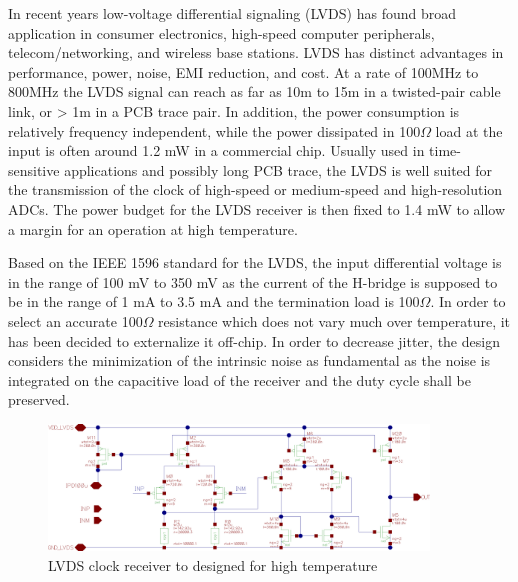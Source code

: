 In recent years low-voltage differential signaling (LVDS) has found broad application in consumer electronics, high-speed computer peripherals, telecom/networking, and wireless base stations. LVDS has distinct advantages in performance, power, noise, EMI reduction, and cost. At a rate of 100MHz to 800MHz the LVDS signal can reach as far as 10m to 15m in a twisted-pair cable link, or > 1m in a PCB trace pair. In addition, the power consumption is relatively frequency independent, while the power dissipated in 100$\Omega$ load at the input is often around 1.2 mW in a commercial chip. Usually used in time-sensitive applications and possibly long PCB trace, the LVDS is well suited for the transmission of the clock of high-speed or medium-speed and high-resolution ADCs. The power budget for the LVDS receiver is then fixed to 1.4 mW to allow a margin for an operation at high temperature.

Based on the IEEE 1596 standard for the LVDS, the input differential voltage is in the range of 100 mV to 350 mV as the current of the H-bridge is supposed to be in the range of 1 mA to 3.5 mA and the termination load is 100$\Omega$. In order to select an accurate 100$\Omega$ resistance which does not vary much over temperature, it has been decided to externalize it off-chip. In order to decrease jitter, the design considers the minimization of the intrinsic noise as fundamental as the noise is integrated on the capacitive load of the receiver and the duty cycle shall be preserved.

\begin{figure}[htp]
    \centering
    \includegraphics[width=0.9\textwidth]{Chapter5/Figs/adc_chip/clk-recovery.png}
    \caption{LVDS clock receiver to designed for high temperature}
    \label{fig:lvds-receiver}
\end{figure}

